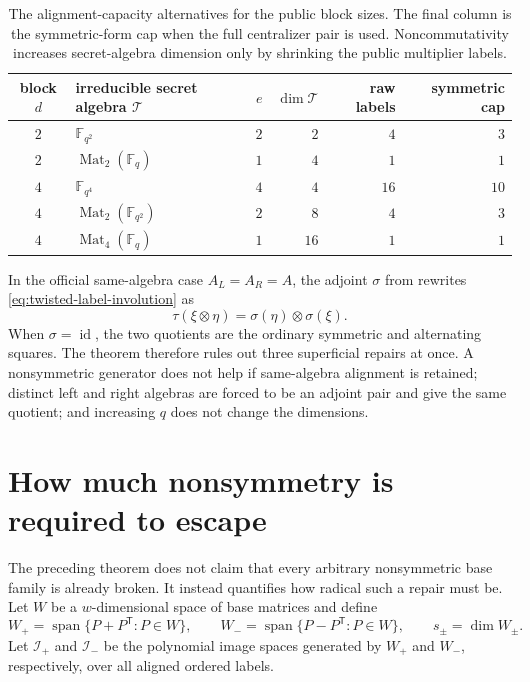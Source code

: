 \documentclass[11pt]{article}
\newcommand{\F}{\mathbb F}
\newcommand{\Mat}{\operatorname{Mat}}
\newcommand{\Span}{\operatorname{span}}
\newcommand{\transpose}{\mathsf T}
\begin{document}
\begin{table}[H]
\centering
\caption{The alignment-capacity alternatives for the public block sizes.
The final column is the symmetric-form cap when the full centralizer pair is
used.  Noncommutativity increases secret-algebra dimension only by shrinking
the public multiplier labels.}
\label{tab:alignment-capacity-examples}
\small
\renewcommand{\arraystretch}{1.12}
\begin{tabular}{@{}c l r r r r@{}}
\toprule
block $d$ & irreducible secret algebra $\mathcal T$ & $e$ & $\dim\mathcal T$ & raw labels & symmetric cap\\
\midrule
$2$ & $\F_{q^2}$ & $2$ & $2$ & $4$ & $3$\\
$2$ & $\Mat_2(\F_q)$ & $1$ & $4$ & $1$ & $1$\\
$4$ & $\F_{q^4}$ & $4$ & $4$ & $16$ & $10$\\
$4$ & $\Mat_2(\F_{q^2})$ & $2$ & $8$ & $4$ & $3$\\
$4$ & $\Mat_4(\F_q)$ & $1$ & $16$ & $1$ & $1$\\
\bottomrule
\end{tabular}
\end{table}

In the official same-algebra case $A_L=A_R=A$, the adjoint $\sigma$ from
 rewrites
\eqref{eq:twisted-label-involution} as
\[
 \tau(\xi\otimes\eta)=\sigma(\eta)\otimes\sigma(\xi).
\]
When $\sigma=\operatorname{id}$, the two quotients are the ordinary symmetric
and alternating squares.  The theorem therefore rules out three superficial
repairs at once.  A nonsymmetric generator does not help if same-algebra
alignment is retained; distinct left and right algebras are forced to be an
adjoint pair and give the same quotient; and increasing $q$ does not change
the dimensions.

\section{How much nonsymmetry is required to escape}
\label{sec:maximally-nonselfadjoint}

The preceding theorem does not claim that every arbitrary nonsymmetric base
family is already broken.  It instead quantifies how radical such a repair
must be.  Let $W$ be a $w$-dimensional space of base matrices and define
\[
 W_+=\Span\{P+P^\transpose:P\in W\},
 \qquad
 W_-=\Span\{P-P^\transpose:P\in W\},
 \qquad s_\pm=\dim W_\pm.
\]
Let $\mathcal I_+$ and $\mathcal I_-$ be the polynomial image spaces
generated by $W_+$ and $W_-$, respectively, over all aligned ordered labels.
\end{document}
